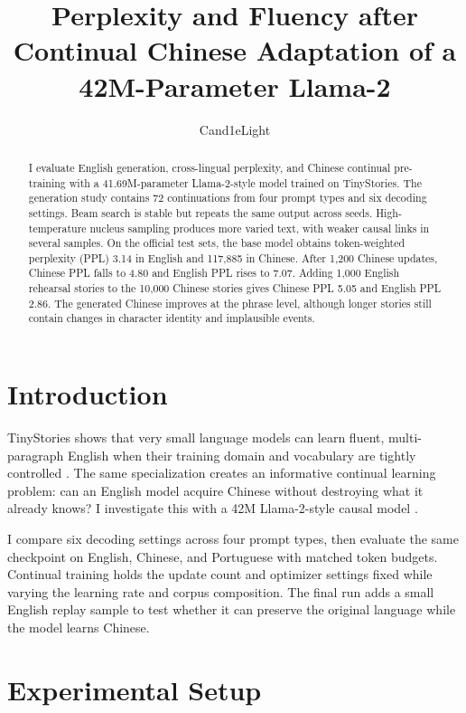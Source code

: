 \documentclass[11pt]{article}
\title{Perplexity and Fluency after Continual Chinese Adaptation of a 42M-Parameter Llama-2}
\author{Cand1eLight}
\date{}
\begin{document}
\maketitle

\begin{abstract}
I evaluate English generation, cross-lingual perplexity, and Chinese continual pre-training
with a 41.69M-parameter Llama-2-style model trained on TinyStories. The generation study
contains 72 continuations from four prompt types and six decoding settings. Beam search is
stable but repeats the same output across seeds. High-temperature nucleus sampling produces
more varied text, with weaker causal links in several samples. On the official test sets,
the base model obtains token-weighted perplexity (PPL) 3.14 in English and 117,885 in Chinese.
After 1,200 Chinese updates, Chinese PPL falls to 4.80 and English PPL rises to 7.07. Adding
1,000 English rehearsal stories to the 10,000 Chinese stories gives Chinese PPL 5.05 and
English PPL 2.86. The generated Chinese improves at the phrase level, although longer
stories still contain changes in character identity and implausible events.
\end{abstract}

\section{Introduction}

TinyStories shows that very small language models can learn fluent, multi-paragraph
English when their training domain and vocabulary are tightly controlled
\citep{eldan2023tinystories}. The same specialization creates an informative continual
learning problem: can an English model acquire Chinese without destroying what it already
knows? I investigate this with a 42M Llama-2-style causal model
\citep{touvron2023llama,karpathyTinyLlamas}.

I compare six decoding settings across four prompt types, then evaluate the same checkpoint
on English, Chinese, and Portuguese with matched token budgets. Continual training holds the
update count and optimizer settings fixed while varying the learning rate and corpus
composition. The final run adds a small English replay sample to test whether it can preserve
the original language while the model learns Chinese.

\section{Experimental Setup}
\end{document}
